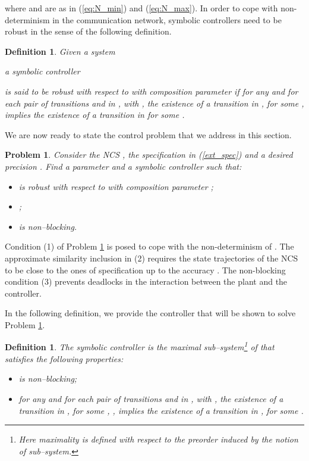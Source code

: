 \documentclass{amsart}
\newtheorem{problem}[theorem]{Problem}
\newtheorem{definition}[theorem]{Definition}
\begin{document}
where  and  are as in (\ref{eq:N_min}) and (\ref{eq:N_max}). In order to cope with non-determinism in the communication network, symbolic controllers need to be robust in the sense of the following definition.
\begin{definition}
Given a system 

a symbolic controller 

is said to be \emph{robust with respect to  with composition parameter } if for any  and for each pair of transitions  and  in , with , the existence of a transition  in , for some , implies the existence of a transition  in  for some .
\label{def:rob_controller}
\end{definition}

We are now ready to state the control problem that we address in this section.

\begin{problem}
\label{problem}
Consider the NCS , the specification  in (\ref{ext_spec}) and a desired precision . Find a parameter  and a symbolic controller  such that:
\begin{itemize}
\item [(1)]  is robust with respect to  with composition parameter ;
\item [(2)] ;
\item [(3)]  is non--blocking.
\end{itemize}
\end{problem}

Condition (1) of Problem \ref{problem} is posed to cope with the non-determinism of . The approximate similarity inclusion in (2) requires the state trajectories of the NCS to be close to the ones of specification  up to the accuracy . The non-blocking condition (3) prevents deadlocks in the interaction between the plant and the controller. 

In the following definition, we provide the controller  that will be shown to solve Problem \ref{problem}.

\begin{definition}
The symbolic controller  is the maximal sub--system\footnote{Here maximality is defined with respect to the preorder induced by the notion of sub--system.}  of  that satisfies the following properties:
\begin{itemize}
\item  is non--blocking;
\item for any  and for each pair of transitions  and  in , with , the existence of a transition  in , for some , , implies the existence of a transition   in , for some .
\end{itemize}
\label{canon_contr}
\end{definition}
\end{document}
